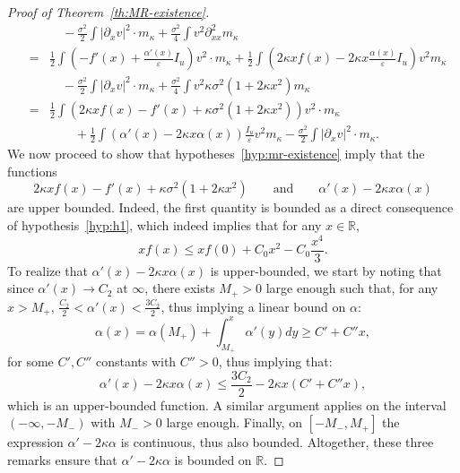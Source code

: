 \documentclass[onefignum,onetabnum]{siamart190516}
\newcommand{\R}{\mathbb{R}}
\newcommand{\1}{\mathbbm{1}}
\newcommand{\eps}{\varepsilon}
\begin{document}
\begin{proof}[Proof of Theorem~\ref{th:MR-existence}]
\begin{eqnarray*}
&&\quad-\frac{\sigma^2}{2}\int |\partial_{x}v|^2\cdot {m_\kappa}+\frac{\sigma^2}{4}\int v^2 \partial^2_{xx}{m_\kappa}\\
&=& \frac12\int \left(-f'(x)+\frac{\alpha'(x)}{\eps}I_u \right)v^2\cdot {m_\kappa}+\frac12\int \left(2\kappa x f(x)-2\kappa x \frac{\alpha(x)}{\eps}I_u \right)v^2  m_\kappa\\
&&\quad-\frac{\sigma^2}{2}\int |\partial_{x}v|^2\cdot {m_\kappa}+\frac{\sigma^2}{4}\int v^2 \kappa\sigma^2(1+2\kappa x^2) {m_\kappa}\\
&=& \frac12\int \left(2\kappa x f(x)-f'(x)+ \kappa\sigma^2(1+2\kappa x^2) \right)v^2\cdot {m_\kappa}\\
&& \qquad +\frac12\int \left(\alpha'(x)-2\kappa x\alpha(x)\right)\frac{I_u}{\eps} v^2  m_\kappa-\frac{\sigma^2}{2}\int |\partial_{x}v|^2\cdot {m_\kappa}.
%
\end{eqnarray*}
We now proceed to show that hypotheses~\eqref{hyp:mr-existence} imply that the functions
$$
2\kappa xf(x)-f'(x)+\kappa\sigma^2(1+2\kappa x^2)\qquad\text{and}\qquad \alpha'(x)-2\kappa x\alpha(x)
$$
are upper bounded. Indeed, the first quantity is bounded as a direct consequence of hypothesis~\eqref{hyp:h1}, which indeed implies that for any $x\in\R$,
\begin{equation}
\label{eq:aux0}
xf(x)\leq xf(0)+C_0x^2-C_0\frac{x^4}{3}.
\end{equation}
To realize that $ \alpha'(x)-2\kappa x\alpha(x)$ is upper-bounded, we start by noting that since $\alpha'(x) \to C_2$ at $\infty$, there exists $M_+>0$ large enough such that, for any $x>M_+$, $\frac{C_2}{2}<\alpha'(x)<\frac{3C_2}{2}$, thus implying a linear bound on $\alpha$:
$$
\alpha(x)=\alpha(M_+)+\int_{M_+}^x \alpha'(y)dy\geq C'+C''x,
$$
for some $C',C''$ constants with $C''>0$, thus implying that:
$$
\alpha'(x)-2\kappa x\alpha(x)\leq \frac{3C_2}{2}-2\kappa x(C'+C''x),
$$
which is an upper-bounded function.  A similar argument applies on the interval $(-\infty,-M_-)$ with $M_->0$ large enough. Finally, on $[-M_-,M_+]$ the expression $\alpha'-2\kappa \alpha$ is continuous, thus also bounded. Altogether, these three remarks ensure that $\alpha'-2\kappa \alpha$ is bounded on $\R$. 


\end{proof}
\end{document}
